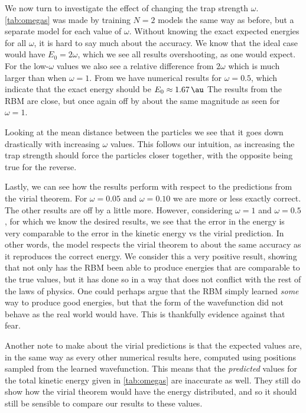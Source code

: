\documentclass[a4paper, 11pt]{article}
\begin{document}
\begin{multicols}{2}
    We now turn to investigate the effect of changing the trap strength
    $\omega$. \autoref{tab:omegas} was made by training $N=2$ models the same way
    as before, but a separate model for each value of $\omega$. Without knowing
    the exact expected energies for all $\omega$, it is hard to say much about
    the accuracy. We know that the ideal case would have $E_0=2\omega$, which we
    see all results overshooting, as one would expect. For the low-$\omega$
    values we also see a relative difference from $2\omega$ which is much larger
    than when $\omega =1$. From \cite{PedersenLohne2011} we have numerical
    results for $\omega = 0.5$, which indicate that the exact energy should be
    $E_0 \approx \SI{1.67}{\au}$ The results from the RBM are close, but once
    again off by about the same magnitude as seen for $\omega=1$.

    Looking at the mean distance between the particles we see that it goes down
    drastically with increasing $\omega$ values. This follows our intuition, as
    increasing the trap strength should force the particles closer together,
    with the opposite being true for the reverse.

    Lastly, we can see how the results perform with respect to the predictions
    from the virial theorem. For $\omega=0.05$ and $\omega=0.10$ we are more or
    less exactly correct. The other results are off by a little more. However,
    considering $\omega=1$ and $\omega=0.5$, for which we know the desired
    results, we see that the error in the energy is very comparable to the error
    in the kinetic energy vs the virial prediction. In other words, the model
    respects the virial theorem to about the same accuracy as it reproduces the
    correct energy. We consider this a very positive result, showing that not
    only has the RBM been able to produce energies that are comparable to the
    true values, but it has done so in a way that does not conflict with the
    rest of the laws of physics. One could perhaps argue that the RBM simply
    learned \emph{some} way to produce good energies, but that the form of the
    wavefunction did not behave as the real world would have. This is thankfully
    evidence against that fear.

    Another note to make about the virial predictions is that the expected
    values are, in the same way as every other numerical results here, computed
    using positions sampled from the learned wavefunction. This means that 
    the \emph{predicted} values for the total kinetic energy given in
    \autoref{tab:omegas} are inaccurate as well. They still do show how the
    virial theorem would have the energy distributed, and so it should still be
    sensible to compare our results to these values.


\end{multicols}
\end{document}
